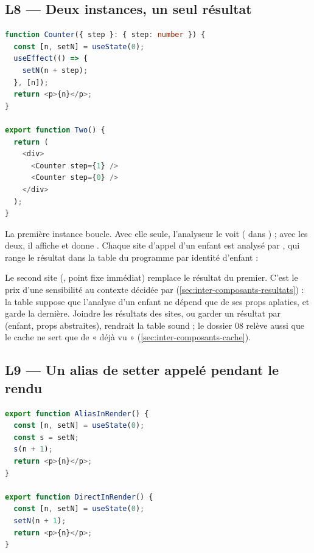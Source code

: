 \subsection{L8 --- Deux instances, un seul résultat}

\begin{lstlisting}[language=TypeScript,caption={\file{/tmp/r27/persp/Persp.tsx} (extrait) ; le témoin \file{/tmp/r27/persp2/One.tsx} ne garde que la première instance}]
function Counter({ step }: { step: number }) {
  const [n, setN] = useState(0);
  useEffect(() => {
    setN(n + step);
  }, [n]);
  return <p>{n}</p>;
}

export function Two() {
  return (
    <div>
      <Counter step={1} />
      <Counter step={0} />
    </div>
  );
}
\end{lstlisting}

La première instance boucle. Avec elle seule, l'analyseur le voit ( dans ) ; avec les deux, il affiche  et  donne . Chaque site d'appel d'un enfant est analysé par , qui range le résultat dans la table du programme par identité d'enfant :


Le second site (, point fixe immédiat) remplace le résultat du premier. C'est le prix d'une sensibilité au contexte décidée par  (\cref{sec:inter-composants-resultats}) : la table  suppose que l'analyse d'un enfant ne dépend que de ses props aplaties, et garde la dernière. Joindre les résultats des sites, ou garder un résultat par (enfant, props abstraites), rendrait la table sound ; le dossier 08 relève aussi que le cache ne sert que de « déjà vu » (\cref{sec:inter-composants-cache}).

\subsection{L9 --- Un alias de setter appelé pendant le rendu}

\begin{lstlisting}[language=TypeScript,caption={\file{/tmp/r27/alias/Alias.tsx}},label={lst:limites-alias}]
export function AliasInRender() {
  const [n, setN] = useState(0);
  const s = setN;
  s(n + 1);
  return <p>{n}</p>;
}

export function DirectInRender() {
  const [n, setN] = useState(0);
  setN(n + 1);
  return <p>{n}</p>;
}
\end{lstlisting}

